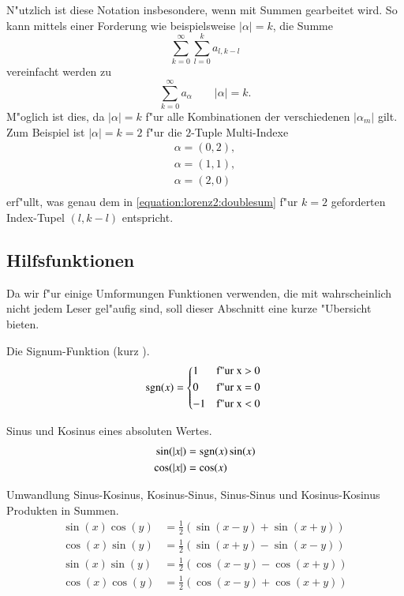 \begin{refsection}
N"utzlich ist diese Notation insbesondere, wenn mit Summen gearbeitet wird. So 
kann mittels einer Forderung wie beispielsweise $|\alpha| = k$, die Summe
\begin{equation}
	\sum_{k = 0}^{\infty}\sum_{l = 0}^{k}a_{l, k - l}
	\label{equation:lorenz2:doublesum}
\end{equation}
vereinfacht werden zu
\begin{equation}
	\sum_{k = 0}^{\infty}a_{\alpha} \qquad |\alpha| = k.
	\label{equation:lorenz2:mmsum}
\end{equation}
M"oglich ist dies, da $|\alpha| = k$ f"ur alle Kombinationen der verschiedenen 
$|\alpha_m|$ gilt. Zum Beispiel ist $|\alpha| = k = 2$ f"ur die $2$-Tuple 
Multi-Indexe
\begin{align*}
	\alpha = (0, 2), \\
	\alpha = (1, 1), \\
	\alpha = (2, 0) \\
\end{align*}
erf"ullt, was genau dem in \cref{equation:lorenz2:doublesum} f"ur $k = 2$ 
geforderten Index-Tupel $(l, k - l)$ entspricht.

\subsection{Hilfsfunktionen}
Da wir f"ur einige Umformungen Funktionen verwenden, die mit wahrscheinlich 
nicht jedem Leser gel"aufig sind, soll dieser Abschnitt eine kurze "Ubersicht 
bieten.

Die Signum-Funktion (kurz \sgn).
\begin{equation}
\sgn(x) =
\begin{cases*}
1 & f"ur x > 0 \\
0 & f"ur x = 0 \\
-1 & f"ur x < 0
\end{cases*}
\end{equation}

Sinus und Kosinus eines absoluten Wertes.
\begin{align*}
\sin(|x|) &= \sgn(x)\sin(x)
\\
\cos(|x|) &= \cos(x)
\end{align*}

Umwandlung Sinus-Kosinus, Kosinus-Sinus, Sinus-Sinus und Kosinus-Kosinus 
Produkten in Summen.
\begin{align*}
\sin(x)\cos(y) &= \frac{1}{2} \left(\sin(x - y) + \sin(x + y)\right)
\\
\cos(x)\sin(y) &= \frac{1}{2} \left(\sin(x + y) - \sin(x - y)\right)
\\
\sin(x)\sin(y) &= \frac{1}{2} \left(\cos(x - y) - \cos(x + y)\right)
\\
\cos(x)\cos(y) &= \frac{1}{2} \left(\cos(x - y) + \cos(x + y)\right)
\end{align*}


\end{refsection}
